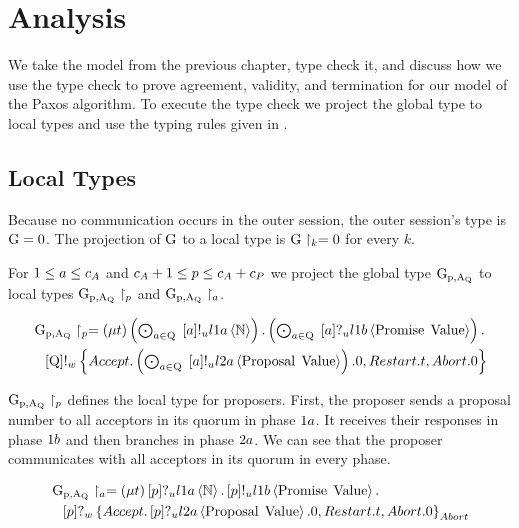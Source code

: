 \chapter{Analysis}
We take the model from the previous chapter, type check it, and discuss how we use the type check to prove agreement, validity, and termination for our model of the Paxos algorithm.
To execute the type check we project the global type to local types and use the typing rules given in \cite{PetersEtal21}.

\section{Local Types}
Because no communication occurs in the outer session, the  outer session's type is $\operatorname{G} = 0$.
The projection of $\operatorname{G}$ to a local type is $\operatorname{G} \upharpoonright_{k} = 0$ for every $k$.

For $1 \leq a \leq c_A$ and $c_A + 1 \leq p \leq c_A + c_P$ we project the global type $\operatorname{G_{p, A_Q}}$ to local types $\operatorname{G_{p, A_Q}} \upharpoonright_{p}$ and $\operatorname{G_{p, A_Q}} \upharpoonright_{a}$.

\begin{align*}
&\operatorname{G_{p, A_Q}} \upharpoonright_{p} = \left(\mu t\right)
\textstyle\left(\bigodot_{a\in\operatorname{Q}}\;\left[a\right]!_u l1a \left\langle \mathbb{N} \right\rangle\right) .
\textstyle\left(\bigodot_{a\in\operatorname{Q}}\;\left[a\right]?_u l1b \left\langle \operatorname{Promise}\; \operatorname{Value} \right\rangle\right) .\\
&\hspace*{0.75em * 1}\left[\operatorname{Q}\right]!_w \left\{\mathnormal{Accept} . \textstyle\left(\bigodot_{a\in\operatorname{Q}}\;\left[a\right]!_u l2a \left\langle \operatorname{Proposal}\; \operatorname{Value} \right\rangle\right).0 , \mathnormal{Restart} . t , \mathnormal{Abort} .0\right\}
\end{align*}

$\operatorname{G_{p, A_Q}} \upharpoonright_{p}$ defines the local type for proposers.
First, the proposer sends a proposal number to all acceptors in its quorum in phase $1a$.
It receives their responses in phase $1b$ and then branches in phase $2a$.
We can see that the proposer communicates with all acceptors in its quorum in every phase.

\begin{align*}
&\operatorname{G_{p, A_Q}} \upharpoonright_{a} = \left(\mu t\right)
\left[p\right]?_u l1a \left\langle \mathbb{N} \right\rangle .
\left[p\right]!_u l1b \left\langle \operatorname{Promise}\; \operatorname{Value} \right\rangle .\\
&\hspace*{0.75em * 1}\left[p\right]?_w \left\{\mathnormal{Accept} . \left[p\right]?_u l2a \left\langle \operatorname{Proposal}\; \operatorname{Value} \right\rangle.0 , \mathnormal{Restart} . t , \mathnormal{Abort} .0\right\}_{\mathnormal{Abort}}
\end{align*}

